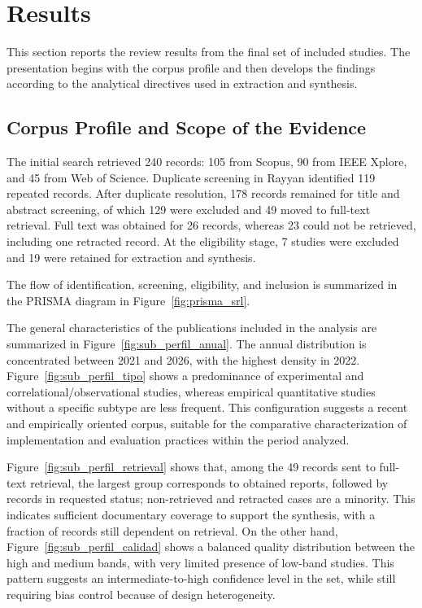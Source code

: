 \section{Results}
This section reports the review results from the final set of included studies. The presentation begins with the corpus profile and then develops the findings according to the analytical directives used in extraction and synthesis.

\subsection{Corpus Profile and Scope of the Evidence}
The initial search retrieved 240 records: 105 from Scopus, 90 from IEEE Xplore, and 45 from Web of Science. Duplicate screening in Rayyan identified 119 repeated records. After duplicate resolution, 178 records remained for title and abstract screening, of which 129 were excluded and 49 moved to full-text retrieval. Full text was obtained for 26 records, whereas 23 could not be retrieved, including one retracted record. At the eligibility stage, 7 studies were excluded and 19 were retained for extraction and synthesis.

The flow of identification, screening, eligibility, and inclusion is summarized in the PRISMA diagram in Figure~\ref{fig:prisma_srl}.

The general characteristics of the publications included in the analysis are summarized in Figure~\ref{fig:sub_perfil_anual}. The annual distribution is concentrated between 2021 and 2026, with the highest density in 2022. Figure~\ref{fig:sub_perfil_tipo} shows a predominance of experimental and correlational/observational studies, whereas empirical quantitative studies without a specific subtype are less frequent. This configuration suggests a recent and empirically oriented corpus, suitable for the comparative characterization of implementation and evaluation practices within the period analyzed.


Figure~\ref{fig:sub_perfil_retrieval} shows that, among the 49 records sent to full-text retrieval, the largest group corresponds to obtained reports, followed by records in requested status; non-retrieved and retracted cases are a minority. This indicates sufficient documentary coverage to support the synthesis, with a fraction of records still dependent on retrieval. On the other hand, Figure~\ref{fig:sub_perfil_calidad} shows a balanced quality distribution between the high and medium bands, with very limited presence of low-band studies. This pattern suggests an intermediate-to-high confidence level in the set, while still requiring bias control because of design heterogeneity.


